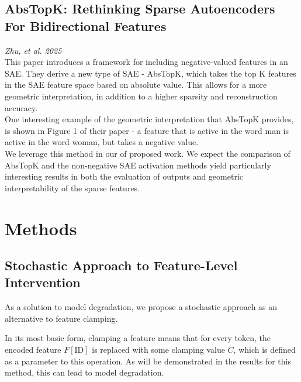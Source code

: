 \documentclass{article}
\begin{document}
\subsection{AbsTopK: Rethinking Sparse Autoencoders For Bidirectional Features}
\textit{Zhu, et al. 2025}
\cite{abstopk}\\

This paper introduces a framework for including negative-valued features in an SAE. They derive a new type of SAE - AbsTopK, which takes the top K features in the SAE feature space based on absolute value. This allows for a more geometric interpretation, in addition to a higher sparsity and reconstruction accuracy.\\

One interesting example of the geometric interpretation that AbsTopK provides, is shown in Figure 1 of their paper - a feature that is active in the word man is active in the word woman, but takes a negative value. \\

We leverage this method in our  of proposed work. We expect the comparison of AbsTopK and the non-negative SAE activation methods yield particularly interesting results in both the evaluation of outputs and geometric interpretability of the sparse features.\\

\section{Methods}

\subsection{Stochastic Approach to Feature-Level Intervention}

As a solution to model degradation, we propose a stochastic approach as an alternative to feature clamping.

In its most basic form, clamping a feature means that for every token, the encoded feature $F[\text{ID}]$ is replaced with some clamping value $C$, which is defined as a parameter to this operation. As will be demonstrated in the results for this method, this can lead to model degradation.\\
\end{document}
